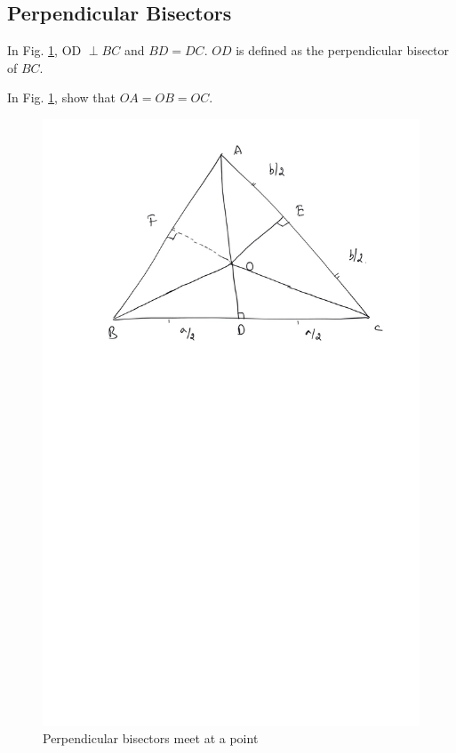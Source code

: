\subsection{Perpendicular Bisectors}
\begin{definition}
	In Fig. \ref{ch3_perp_bisector}, OD $\perp BC$ and $BD=DC$. $OD$ is defined as the perpendicular bisector of $BC$.
\end{definition}

\begin{problem}
	In Fig. \ref{ch3_perp_bisector}, show that $OA=OB=OC$.
\end{problem}
%
%
\begin{figure}[!h]
	\begin{center}
		
		\includegraphics[width=\columnwidth]{./figs/ch3_perp_bisector}
		\vspace*{-10cm}
	\end{center}
	\caption{Perpendicular bisectors meet at a point}
	\label{ch3_perp_bisector}	
\end{figure}

